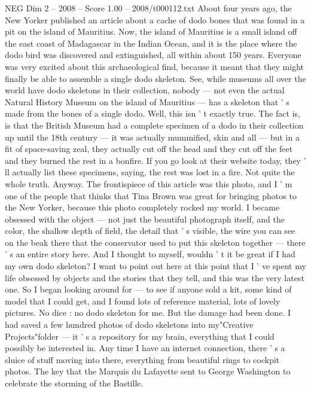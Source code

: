 \begin{textsample}{NEG Dim 2 – 2008 – Score 1.00 – 2008/t000112.txt}  \label{ex:f2_neg_025}
About four years ago, the New Yorker published an article about a cache of dodo bones that was found in a pit on the island of Mauritius.
Now, the island of Mauritius is a small island off the east coast of Madagascar in the Indian Ocean, and it is the place where the dodo bird was discovered and extinguished, all within about 150 years.
Everyone was very excited about this archaeological find, because it meant that they might finally be able to assemble a single dodo skeleton.
See, while museums all over the world have dodo skeletons in their collection, nobody — not even the actual Natural History Museum on the island of Mauritius — has a skeleton that ' s made from the bones of a single dodo.
Well, this isn ' t exactly true.
The fact is, is that the British Museum had a complete specimen of a dodo in their collection up until the 18th century — it was actually mummified, skin and all — but in a fit of space-saving zeal, they actually cut off the head and they cut off the feet and they burned the rest in a bonfire.
If you go look at their website today, they ' ll actually list these specimens, saying, the rest was lost in a fire.
Not quite the whole truth.
Anyway.
The frontispiece of this article was this photo, and I ' m one of the people that thinks that Tina Brown was great for bringing photos to the New Yorker, because this photo completely rocked my world.
I became obsessed with the object — not just the beautiful photograph itself, and the color, the shallow depth of field, the detail that ' s visible, the wire you can see on the beak there that the conservator used to put this skeleton together — there ' s an entire story here.
And I thought to myself, wouldn ' t it be great if I had my own dodo skeleton?
I want to point out here at this point that I ' ve spent my life obsessed by objects and the stories that they tell, and this was the very latest one.
So I began looking around for — to see if anyone sold a kit, some kind of model that I could get, and I found lots of reference material, lots of lovely pictures.
No dice : no dodo skeleton for me.
But the damage had been done.
I had saved a few hundred photos of dodo skeletons into my"Creative Projects"folder — it ' s a repository for my brain, everything that I could possibly be interested in.
Any time I have an internet connection, there ' s a sluice of stuff moving into there, everything from beautiful rings to cockpit photos.
The key that the Marquis du Lafayette sent to George Washington to celebrate the storming of the Bastille.

\end{textsample}
